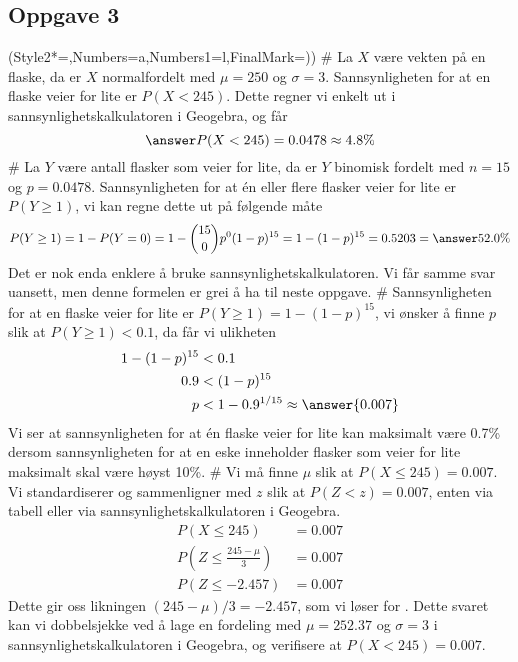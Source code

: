 \subsection*{Oppgave 3}
\begin{easylist}[enumerate]
	\ListProperties(Style2*=,Numbers=a,Numbers1=l,FinalMark={)})
	# La $X$ være vekten på en flaske, da er $X$ normalfordelt med $\mu = 250$ og $\sigma = 3$.
	Sannsynligheten for at en flaske veier for lite er $P(X< 245)$.
	Dette regner vi enkelt ut i sannsynlighetskalkulatoren i Geogebra, og får
	\begin{equation*}
		\answer{P(X < 245) = 0.0478 \approx 4.8 \%}
	\end{equation*}
	# La $Y$ være antall flasker som veier for lite,
	da er $Y$ binomisk fordelt med $n = 15$ og $p = 0.0478$.
	Sannsynligheten for at én eller flere flasker veier for lite er $P(Y \geq 1)$, vi kan regne dette ut på følgende måte
	\begin{equation*}
		P(Y \geq 1) = 1 - P(Y = 0) = 1 - \binom{15}{0}p^0(1-p)^{15} = 1 - (1 - p)^{15} = 0.5203 = \answer{52.0\%}
	\end{equation*}
	Det er nok enda enklere å bruke sannsynlighetskalkulatoren. Vi får samme svar uansett, men denne formelen er grei å ha til neste oppgave.
	# Sannsynligheten for at en flaske veier for lite er $P(Y \geq 1) = 1 -  (1-p)^{15}$, vi ønsker å finne $p$ slik at $P(Y \geq 1) < 0.1$, da får vi ulikheten
	\begin{align*}
	1  - (1-p)^{15} & < 0.1 \\
	0.9 & < (1-p)^{15} \\
	p & < 1 - 0.9^{1/15} \approx \answer{0.007}
	\end{align*}
	Vi ser at sannsynligheten for at én flaske veier for lite kan maksimalt være 0.7\% dersom sannsynligheten for at en eske inneholder flasker som veier for lite maksimalt skal være høyst 10\%.
	# Vi må finne $\mu$ slik at $P(X \leq 245) = 0.007$. Vi standardiserer og sammenligner med $z$ slik at $P(Z < z) = 0.007$, enten via tabell eller via sannsynlighetskalkulatoren i Geogebra.
	\begin{align*}
		P(X \leq 245) &= 0.007 \\
		P\left(Z \leq \frac{245 - \mu}{3} \right) &= 0.007 \\
		P\left(Z \leq - 2.457 \right) &= 0.007 
	\end{align*}
	Dette gir oss likningen $(245 - \mu)/3 = - 2.457$, som vi løser for .
	Dette svaret kan vi dobbelsjekke ved å lage en fordeling med $\mu = 252.37$ og $\sigma = 3$ i sannsynlighetskalkulatoren i Geogebra, og verifisere at $P(X < 245) = 0.007$.
\end{easylist}








